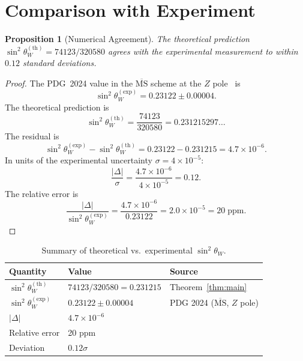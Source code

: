 \documentclass[11pt,a4paper]{article}
\theoremstyle{plain}
\newtheorem{proposition}[theorem]{Proposition}
\theoremstyle{definition}
\newcommand{\sw}{\sin^{2}\!\theta_{W}}
\begin{document}
\section{Comparison with Experiment}\label{sec:comparison}

\begin{proposition}[Numerical Agreement]\label{prop:agreement}
The theoretical prediction $\sw^{(\mathrm{th})} = 74123/320580$ agrees
with the experimental measurement to within $0.12$ standard deviations.
\end{proposition}

\begin{proof}
The PDG~2024 value in the $\overline{\mathrm{MS}}$ scheme at the
$Z$ pole~\cite{pdg2024} is
\begin{equation}\label{eq:pdg}
  \sw^{(\mathrm{exp})} = 0.23122 \pm 0.00004.
\end{equation}
The theoretical prediction is
\begin{equation}\label{eq:theory-value}
  \sw^{(\mathrm{th})} = \frac{74123}{320580} = 0.231215297\ldots
\end{equation}
The residual is
\begin{equation}\label{eq:residual}
  \sw^{(\mathrm{exp})} - \sw^{(\mathrm{th})} = 0.23122 - 0.231215
  = 4.7 \times 10^{-6}.
\end{equation}
In units of the experimental uncertainty $\sigma = 4 \times 10^{-5}$:
\begin{equation}\label{eq:sigma}
  \frac{|\Delta|}{\sigma} = \frac{4.7 \times 10^{-6}}{4 \times 10^{-5}}
  = 0.12.
\end{equation}
The relative error is
\begin{equation}\label{eq:relative}
  \frac{|\Delta|}{\sw^{(\mathrm{exp})}} = \frac{4.7 \times 10^{-6}}{0.23122}
  = 2.0 \times 10^{-5} = 20 \;\text{ppm}.
\end{equation}
\end{proof}

\begin{table}[htbp]
\centering
\caption{Summary of theoretical vs.\ experimental $\sw$.}
\label{tab:summary}
\begin{tabular}{@{}lll@{}}
\toprule
Quantity & Value & Source \\
\midrule
$\sw^{(\mathrm{th})}$ & $74123/320580 = 0.231215$ & Theorem~\ref{thm:main}\\
$\sw^{(\mathrm{exp})}$ & $0.23122 \pm 0.00004$ & PDG 2024
  ($\overline{\mathrm{MS}}$, $Z$ pole)\\
\midrule
$|\Delta|$ & $4.7 \times 10^{-6}$ & \\
Relative error & 20 ppm & \\
Deviation & $0.12\sigma$ & \\
\bottomrule
\end{tabular}
\end{table}
\end{document}
